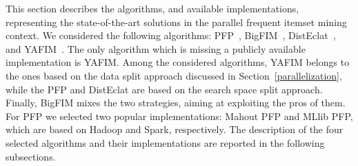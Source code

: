 This section describes the algorithms, and available implementations, representing the state-of-the-art
solutions in the parallel frequent itemset mining context. We considered the following algorithms:
PFP~\cite{pfpgrowth},
BigFIM~\cite{bigfim}, DistEclat~\cite{bigfim},
and YAFIM~\cite{YAFIM}.
The only algorithm which is missing a publicly available implementation is YAFIM.
Among the considered algorithms, YAFIM belongs to the ones based on the data split approach discussed in Section~\ref{parallelization}, 
while the PFP and DistEclat are based on the search space split approach. Finally, BigFIM mixes the two strategies, aiming at exploiting the pros of them.
For PFP we selected two popular implementations: Mahout PFP and MLlib PFP, which are based on Hadoop and Spark, respectively.  
The description of the four selected algorithms and their implementations are reported in the following subsections.



